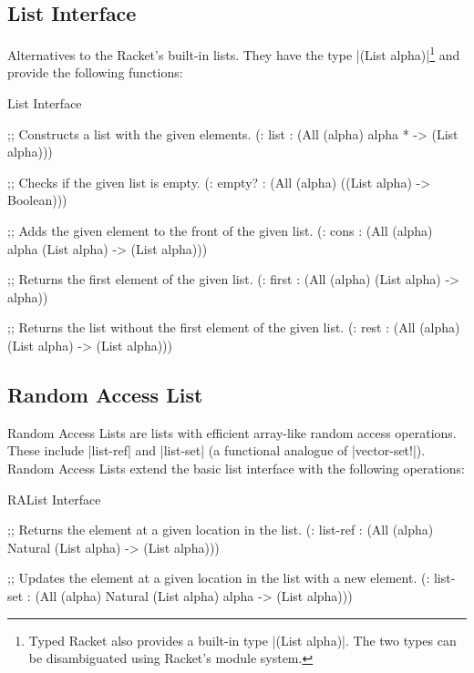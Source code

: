 \subsection{List Interface}

Alternatives to the Racket's built-in lists. They have the type
\scheme|(List alpha)|\footnote{Typed Racket also provides a built-in
type \scheme|(List alpha)|. The two types can be disambiguated using
Racket's module system.} and provide the following functions:


\begin{file}{List Interface}
  \begin{schemedisplay}
    ;; Constructs a list with the given elements.
    (: list : (All (alpha) alpha * -> (List alpha)))

    ;; Checks if the given list is empty.
    (: empty? : (All (alpha) ((List alpha) -> Boolean)))


    ;; Adds the given element to the front of the given list.
    (: cons : (All (alpha) alpha (List alpha) -> (List alpha)))


    ;; Returns the first element of the given list.
    (: first : (All (alpha) (List alpha) -> alpha))


    ;; Returns the list without the first element of the given list.
    (: rest : (All (alpha) (List alpha) -> (List alpha)))

  \end{schemedisplay}
\end{file}

\subsection*{Random Access List}
Random Access Lists are lists with efficient array-like random access
operations. These include \scheme|list-ref| and \scheme|list-set| (a
functional analogue of \scheme|vector-set!|). Random Access Lists
extend the basic list interface with the following operations:

\begin{file}{RAList Interface}
  \begin{schemedisplay}

    ;; Returns the element at a given location in the list.
    (: list-ref : (All (alpha) Natural (List alpha) -> (List alpha)))


    ;; Updates the element at a given location in the list with a new element.
    (: list-set : (All (alpha) Natural (List alpha) alpha -> (List alpha)))

  \end{schemedisplay}
\end{file}

